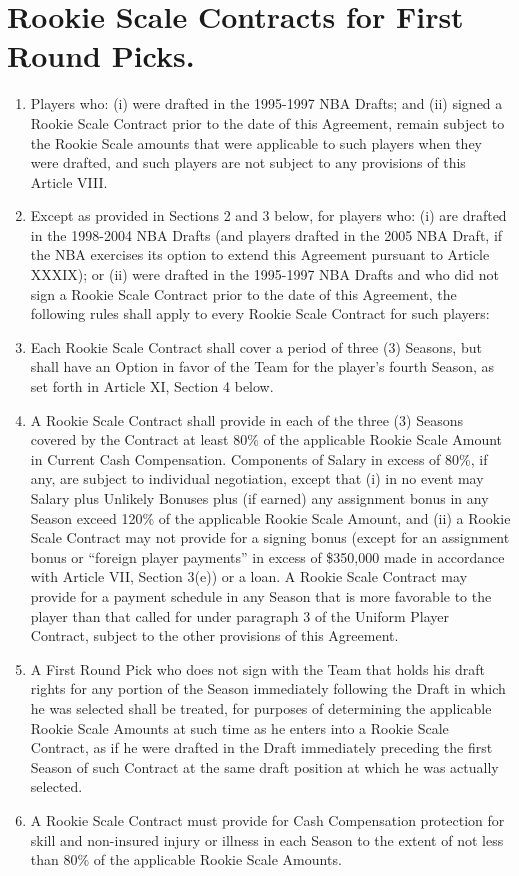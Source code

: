 \documentclass[
]{book}
\providecommand{\tightlist}{%
  \setlength{\itemsep}{0pt}\setlength{\parskip}{0pt}}
\begin{document}
\hypertarget{rookie-scale-contracts-for-first-round-picks.}{%
\section{Rookie Scale Contracts for First Round Picks.}\label{rookie-scale-contracts-for-first-round-picks.}}

\begin{enumerate}
\def\labelenumi{(\alph{enumi})}
\tightlist
\item
  Players who: (i) were drafted in the 1995-1997 NBA Drafts; and (ii) signed a Rookie Scale Contract prior to the date of this Agreement, remain subject to the Rookie Scale amounts that were applicable to such players when they were drafted, and such players are not subject to any provisions of this Article VIII.
\item
  Except as provided in Sections 2 and 3 below, for players who: (i) are drafted in the 1998-2004 NBA Drafts (and players drafted in the 2005 NBA Draft, if the NBA exercises its option to extend this Agreement pursuant to Article XXXIX); or (ii) were drafted in the 1995-1997 NBA Drafts and who did not sign a Rookie Scale Contract prior to the date of this Agreement, the following rules shall apply to every Rookie Scale Contract for such players:
\item
  Each Rookie Scale Contract shall cover a period of three (3) Seasons, but shall have an Option in favor of the Team for the player's fourth Season, as set forth in Article XI, Section 4 below.
\item
  A Rookie Scale Contract shall provide in each of the three (3) Seasons covered by the Contract at least 80\% of the applicable Rookie Scale Amount in Current Cash Compensation. Components of Salary in excess of 80\%, if any, are subject to individual negotiation, except that (i) in no event may Salary plus Unlikely Bonuses plus (if earned) any assignment bonus in any Season exceed 120\% of the applicable Rookie Scale Amount, and (ii) a Rookie Scale Contract may not provide for a signing bonus (except for an assignment bonus or ``foreign player payments'' in excess of \$350,000 made in accordance with Article VII, Section 3(e)) or a loan. A Rookie Scale Contract may provide for a payment schedule in any Season that is more favorable to the player than that called for under paragraph 3 of the Uniform Player Contract, subject to the other provisions of this Agreement.
\item
  A First Round Pick who does not sign with the Team that holds his draft rights for any portion of the Season immediately following the Draft in which he was selected shall be treated, for purposes of determining the applicable Rookie Scale Amounts at such time as he enters into a Rookie Scale Contract, as if he were drafted in the Draft immediately preceding the first Season of such Contract at the same draft position at which he was actually selected.
\item
  A Rookie Scale Contract must provide for Cash Compensation protection for skill and non-insured injury or illness in each Season to the extent of not less than 80\% of the applicable Rookie Scale Amounts.
\end{enumerate}
\end{document}
